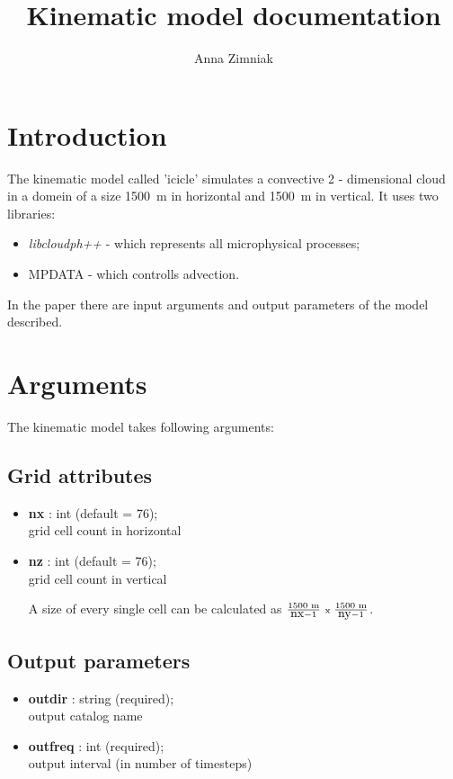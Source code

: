 \documentclass[11pt]{article}
\author[1]{Anna Zimniak}
\affil[1]{Institute of Geophysics, Faculty of Physics, University of Warsaw, Poland}
\title{Kinematic model documentation}
\begin{document}
\maketitle

\section{Introduction}

The kinematic model called 'icicle' simulates a convective 2 - dimensional cloud in a domein of a size 1500~m in horizontal and 1500~m in vertical. It uses two libraries:
\begin{itemize}
	\item \textit{libcloudph++} - which represents all microphysical processes;
	\item MPDATA - which controlls advection.
\end{itemize}

In the paper there are input arguments and output parameters of the model described.

\section{Arguments}

The kinematic model takes following arguments:

\subsection{Grid attributes}

\begin{itemize}
\item \textbf{nx} : int (default = 76);\\ grid cell count in horizontal
\item \textbf{nz} : int (default = 76);\\ grid cell count in vertical

A size of every single cell can be calculated as $\frac{1500\mbox{\scriptsize{ m}}}{\mbox{nx}-1}\mbox{ \scriptsize{x} }\frac{1500\mbox{\scriptsize{ m}}}{\mbox{ny}-1}$.
\end{itemize}

\subsection{Output parameters}

\begin{itemize}
  \item \textbf{outdir} : string (required); \\ output catalog name
  \item \textbf{outfreq} : int (required); \\ output interval (in number of timesteps)
\end{itemize}
\end{document}
